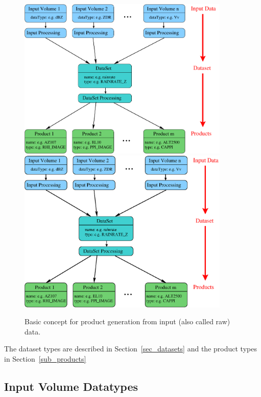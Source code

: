 \documentclass[a4paper,11pt,pdftex,twoside]{scrartcl}
\begin{document}
{{{\begin{figure}[htbp]
  \begin{center}
    \ifpdf
      \includegraphics[width=0.9\textwidth]{./figures/main_concept.pdf}
    \else
      \includegraphics[width=0.9\textwidth]{./figures/main_concept.eps}
    \fi
  \end{center}
  \caption{Basic concept for product generation from input (also called raw) data.}
  \label{fig_main_concept}
\end{figure}

The dataset types are described in Section~\ref{sec_datasets}
and the product types in Section~\ref{sub_products}





\subsection{Input Volume Datatypes}

}}}
\end{document}
